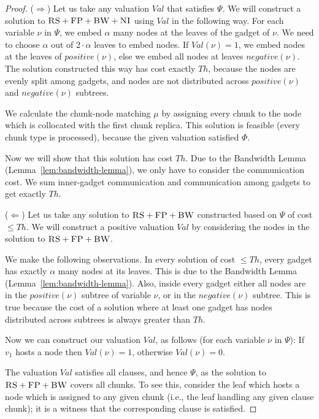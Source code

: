 \documentclass[9pt]{sigcomm-alternate}
\newcommand{\carlo}[1]{\textcolor{red}{carlo: #1}}
\newcommand{\variab}{\nu}
\newcommand{\clauses}{\alpha}
\newcommand{\CC}{\textsc{NI}}
\newcommand{\FP}{\textsc{FP}}
\newcommand{\RS}{\textsc{RS}}
\newcommand{\BW}{\textsc{BW}}
\newcommand{\Formula}{\ensuremath{\Psi}}
\newcommand{\Thr}{\ensuremath{Th}}
\newcommand{\positive}{\ensuremath{positive}}
\newcommand{\negative}{\ensuremath{negative}}
\newcommand{\Val}{\ensuremath{Val}}
\begin{document}
\begin{appendix}
\begin{proof}
($\Rightarrow$) Let us take any valuation $\Val$ that satisfies $\Formula$.
We will construct a solution to $\RS+\FP+\BW+\CC$ using $\Val$ in the following
way.
For each variable $\variab$ in $\Formula$, we embed $\clauses$ many nodes
at the  leaves of the gadget of $\variab$. We need to choose $\clauses$ out of
$2 \cdot \clauses$ leaves to embed nodes. If $\Val(\variab) = 1$, we embed
nodes at the leaves
of $\positive(\variab)$, else we embed all nodes at leaves $\negative(\variab)$.
The solution constructed this way has cost exactly
$\Thr$, because the nodes are evenly split among gadgets, and nodes are not
distributed across $\positive(\variab)$ and $\negative(\variab)$ subtrees.

We calculate the chunk-node matching $\mu$ by assigning every chunk to
the node which is collocated with the first chunk replica. This solution is feasible
(every chunk type is processed),
because the given valuation satisfied $\Phi$.

Now we will show that this solution has cost $\Thr$.
Due to the Bandwidth Lemma (Lemma~\ref{lem:bandwidth-lemma}),
we only have to consider the communication cost. We sum inner-gadget communication and communication among gadgets to get exactly $\Thr$.

($\Leftarrow$) Let us take any solution to $\RS+\FP+\BW$ constructed based on $\Formula$ of cost $\leq \Thr$.
We will construct a positive valuation $\Val$ by considering the nodes in
the solution to $\RS+\FP+\BW$.

We make the following observations. In every solution of cost
$\leq \Thr$, every gadget has exactly $\clauses$ many nodes
at its leaves. This is due to the Bandwidth Lemma (Lemma~\ref{lem:bandwidth-lemma}).
Also, inside
every gadget either all nodes are in the $\positive(\variab)$ subtree
of variable $\variab$, or in the $\negative(\variab)$ subtree. This is true
because the cost of a solution where at least one gadget has nodes
distributed across subtrees is
always greater than $\Thr$.

Now we can construct our valuation $\Val$, as follows
(for each variable $\variab$ in $\Formula$):
If $v_1$ hosts a node then $\Val(\variab) = 1$,
otherwise $\Val(\variab) = 0$.

The valuation $\Val$ satisfies all clauses, and hence $\Formula$,
as the solution to $\RS+\FP+\BW$ covers all chunks. To see this,
consider the leaf which
hosts a node which is assigned to any given chunk (i.e., 
the leaf handling any given clause chunk);
it is a witness that the corresponding clause is satisfied.
\end{proof}


\end{appendix}
\end{document}
